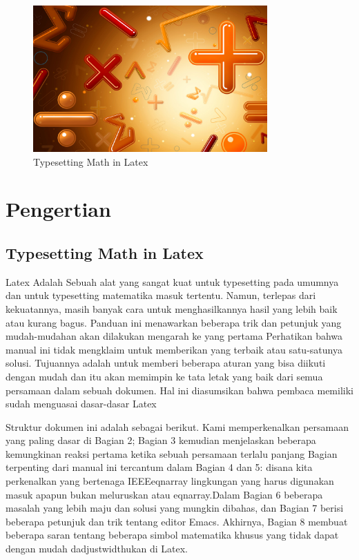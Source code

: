 
\begin{figure}[ht]
	\centerline{\includegraphics[width=0.80\textwidth]{gambar/dapi1.jpg}}
	\caption{Typesetting Math in Latex}
	\label{Typesetting Math in Latex}
\end{figure}


\section {Pengertian }
\subsection {Typesetting Math in Latex}
 \hspace*{0.5in} Latex Adalah Sebuah alat yang sangat kuat untuk typesetting pada umumnya dan untuk typesetting matematika masuk tertentu. Namun, terlepas dari kekuatannya, masih banyak cara untuk menghasilkannya hasil yang lebih baik atau kurang bagus. Panduan ini menawarkan beberapa trik dan petunjuk yang mudah-mudahan akan dilakukan mengarah ke yang pertama Perhatikan bahwa manual ini tidak mengklaim untuk memberikan yang terbaik atau satu-satunya solusi. Tujuannya adalah untuk memberi beberapa aturan yang bisa diikuti dengan mudah dan itu akan memimpin ke tata letak yang baik dari semua persamaan dalam sebuah dokumen. Hal ini diasumsikan bahwa pembaca memiliki sudah menguasai dasar-dasar Latex \par
\noindent 
\hspace*{0.5in} Struktur dokumen ini adalah sebagai berikut. Kami memperkenalkan persamaan yang paling dasar di Bagian 2; Bagian 3 kemudian menjelaskan beberapa kemungkinan reaksi pertama ketika sebuah persamaan terlalu panjang Bagian terpenting dari manual ini tercantum dalam Bagian 4 dan 5: disana kita perkenalkan yang bertenaga IEEEeqnarray lingkungan yang harus digunakan masuk apapun bukan meluruskan atau eqnarray.Dalam Bagian 6 beberapa masalah yang lebih maju dan solusi yang mungkin dibahas, dan Bagian 7 berisi beberapa petunjuk dan trik tentang editor Emacs. Akhirnya, Bagian 8 membuat beberapa saran tentang beberapa simbol matematika khusus yang tidak dapat dengan mudah dadjustwidthukan di Latex. \par
\noindent 
\vspace{12pt}
\noindent 
\vspace{12pt}
\noindent 


